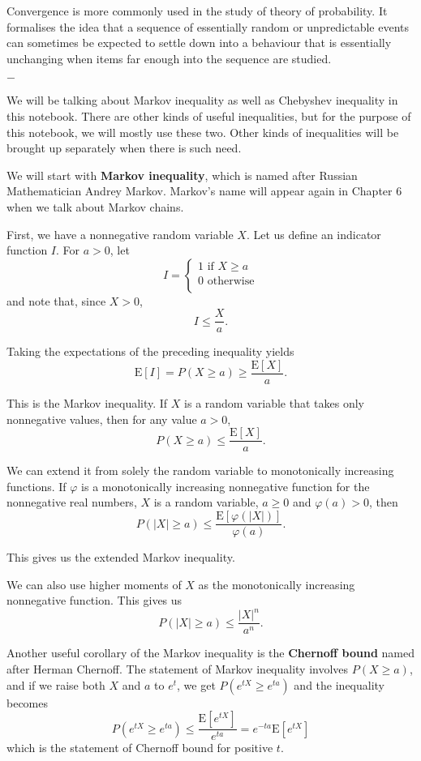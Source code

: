 \documentclass[11pt, a4paper, oneside]{book}
\theoremstyle{definition}
\newcommand{\E}[1]{\text{E}[#1]}
\newcommand{\breaking}{%
    \begin{center}
    $-$
    \end{center}%
}
\begin{document}
\noindent Convergence is more commonly used in the study of theory of probability. It formalises the idea that a sequence of essentially random or unpredictable events can sometimes be expected to settle down into a behaviour that is essentially unchanging when items far enough into the sequence are studied. 

\breaking

\noindent We will be talking about Markov inequality as well as Chebyshev inequality in this notebook. There are other kinds of useful inequalities, but for the purpose of this notebook, we will mostly use these two. Other kinds of inequalities will be brought up separately when there is such need. 

\noindent We will start with \textbf{Markov inequality}, which is named after Russian Mathematician Andrey Markov. Markov's name will appear again in Chapter 6 when we talk about Markov chains.  

\noindent First, we have a nonnegative random variable $X$. Let us define an indicator function $I$. For $a > 0$, let \[
I = 
\begin{cases} 
      1 \text{ if }X \ge a\\
      0 \text{ otherwise}\\
\end{cases}
\]
and note that, since $X > 0$, \[
I \le \frac{X}{a}.
\]

\noindent Taking the expectations of the preceding inequality yields \[
\E{I} = P(X \ge a) \ge \frac{\E{X}}{a}.
\]

\noindent This is the Markov inequality. If $X$ is a random variable that takes only nonnegative values, then for any value $a > 0$, \[
P(X \ge a) \le \frac{\E{X}}{a}. 
\]

\noindent We can extend it from solely the random variable to monotonically increasing functions. If $\varphi$ is a monotonically increasing nonnegative function for the nonnegative real numbers, $X$ is a random variable, $a \ge 0$ and $\varphi(a) > 0$, then \[
P(|X| \ge a) \le \frac{\E{\varphi(|X|)}}{\varphi(a)}. 
\]

\noindent This gives us the extended Markov inequality. 

\noindent We can also use higher moments of $X$ as the monotonically increasing nonnegative function. This gives us \[
P(|X| \ge a) \le \frac{|X|^n}{a^n}. 
\]

\noindent Another useful corollary of the Markov inequality is the \textbf{Chernoff bound} named after Herman Chernoff. The statement of Markov inequality involves $P(X \ge a)$, and if we raise both $X$ and $a$ to $e^t$, we get $P(e^{tX} \ge e^{ta})$ and the inequality becomes\[
P(e^{tX} \ge e^{ta}) \le \frac{\E{e^{tX}}}{e^{ta}} = e^{-ta} \E{e^{tX}}
\]
which is the statement of Chernoff bound for positive $t$. 
\end{document}
